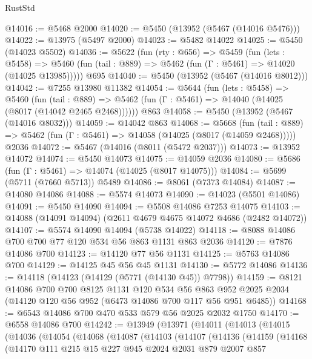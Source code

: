 \begin{lexlean}{RustStd}
\begin{coremodule}
@14016 := @5468 @2000
@14020 := @5450 (@13952 (@5467 (@14016 @5476)))
@14022 := @13975 (@5497 @2000)
@14023 := @5482 @14022
@14025 := @5450 (@14023 @5502)
@14036 := @5622
    (fun (rty : @656) =>
    @5459
      (fun (lets : @5458) =>
      @5460 (fun (tail : @889) => @5462 (fun (Γ : @5461) => @14020 (@14025 @13985)))))
    @695
@14040 := @5450 (@13952 (@5467 (@14016 @8012)))
@14042 := @7255 @13980 @11382
@14054 := @5644
    (fun (lets : @5458) =>
    @5460
      (fun (tail : @889) =>
      @5462 (fun (Γ : @5461) => @14040 (@14025 (@8017 (@14042 @2465 @2468))))))
    @863
@14058 := @5450 (@13952 (@5467 (@14016 @8032)))
@14059 := @14042 @863
@14068 := @5668
    (fun (tail : @889) => @5462 (fun (Γ : @5461) => @14058 (@14025 (@8017 (@14059 @2468)))))
    @2036
@14072 := @5467 (@14016 (@8011 (@5472 @2037)))
@14073 := @13952 @14072
@14074 := @5450 @14073
@14075 := @14059 @2036
@14080 := @5686 (fun (Γ : @5461) => @14074 (@14025 (@8017 @14075)))
@14084 := @5699 (@5711 (@7660 @5713)) @5489
@14086 := @8061 (@7373 @14084)
@14087 := @14080 @14086
@14088 := @5574 @14073
@14090 := @14023 (@5501 @14086)
@14091 := @5450 @14090
@14094 := @5508 @14086 @7253 @14075
@14103 := @14088 (@14091 @14094) (@2611 @4679 @4675 @14072 @4686 (@2482 @14072))
@14107 := @5574 @14090 @14094 (@5738 @14022)
@14118 := @8088 @14086 @700 @700 @77 @120 @534 @56 @863 @1131 @863 @2036
@14120 := @7876 @14086 @700
@14123 := @14120 @77 @56 @1131
@14125 := @5763 @14086 @700
@14129 := @14125 @45 @56 @45 @1131
@14130 := @5772 @14086
@14136 := @14118 (@14123 (@14129 (@5771 (@14130 @45)) @7798))
@14159 := @8121
    @14086
    @700
    @700
    @8125
    @1131
    @120
    @534
    @56
    @863
    @952
    @2025
    @2034
    (@14120 @120 @56 @952 (@6473 @14086 @700 @117 @56 @951 @6485))
@14168 := @6543 @14086 @700 @470 @533 @579 @56 @2025 @2032 @1750
@14170 := @6558 @14086 @700
@14242 := @13949
    (@13971
      (@14011
        (@14013
          (@14015
            (@14036
              (@14054
                (@14068
                  (@14087
                    (@14103
                      (@14107
                        (@14136
                          (@14159
                            (@14168
                              (@14170
                                @111
                                @215
                                @15
                                @227
                                @945
                                @2024
                                @2031
                                @879
                                @2007
                                @857

\end{coremodule}
\end{lexlean}
